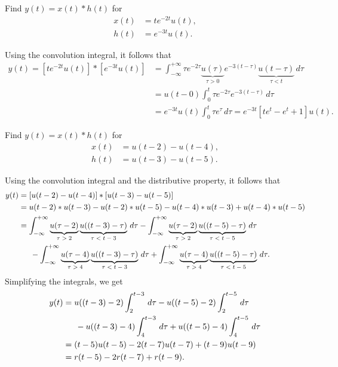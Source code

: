 \documentclass{report}
\begin{document}
\begin{example}
    Find $y(t)=x(t)*h(t)$ for 
    \begin{align*}
        x(t) &= t e^{-2t}u(t), \\
        h(t) &= e^{-3t}u(t).
    \end{align*}
\end{example}
\begin{solution}
    Using the convolution integral, it follows that 
    \begin{align*}
        y(t) = [t e^{-2t}u(t)] * [e^{-3t}u(t)] &= \int_{-\infty}^{+\infty} \tau e^{-2\tau} \underbrace{u(\tau)}_\textrm{$\tau>0$} e^{-3(t-\tau)}\underbrace{u(t-\tau)}_\textrm{$\tau<t$} \,d\tau \\
        &= u(t-0) \int_{0}^{t} \tau e^{-2\tau} e^{-3(t-\tau)} \,d\tau \\
        &= e^{-3t}u(t) \int_{0}^{t} \tau e^{\tau} \,d\tau = e^{-3t}[te^t-e^t+1]u(t).
    \end{align*}
\end{solution}

\begin{example}
    Find $y(t)=x(t)*h(t)$ for 
    \begin{align*}
        x(t) &= u(t-2)-u(t-4), \\
        h(t) &= u(t-3)-u(t-5).
    \end{align*}
\end{example}
\begin{solution}
    Using the convolution integral and the distributive property, it follows that 
    \begin{align*}
        y(t) &= [u(t-2)-u(t-4)] * [u(t-3)-u(t-5)] \\
        &= u(t-2) * u(t-3) - u(t-2) * u(t-5) - u(t-4) * u(t-3) + u(t-4) * u(t-5) \\
        &= \int_{-\infty}^{+\infty} \underbrace{u(\tau-2)}_\textrm{$\tau>2$} \underbrace{u((t-3)-\tau)}_\textrm{$\tau<t-3$} \,d\tau 
        -\int_{-\infty}^{+\infty} \underbrace{u(\tau-2)}_\textrm{$\tau>2$} \underbrace{u((t-5)-\tau)}_\textrm{$\tau<t-5$} \,d\tau \\
        & \indent -\int_{-\infty}^{+\infty} \underbrace{u(\tau-4)}_\textrm{$\tau>4$} \underbrace{u((t-3)-\tau)}_\textrm{$\tau<t-3$} \,d\tau 
        +\int_{-\infty}^{+\infty} \underbrace{u(\tau-4)}_\textrm{$\tau>4$} \underbrace{u((t-5)-\tau)}_\textrm{$\tau<t-5$} \,d\tau.
    \end{align*}
    Simplifying the integrals, we get
    \begin{align*}
        y(t) &= u((t-3)-2)\int_{2}^{t-3} \,d\tau -u((t-5)-2)\int_{2}^{t-5} \,d\tau \\
        & \indent -u((t-3)-4)\int_{4}^{t-3} \,d\tau +u((t-5)-4)\int_{4}^{t-5} \,d\tau \\
        &= (t-5)u(t-5) -2(t-7)u(t-7) +(t-9)u(t-9) \\
        &= r(t-5) - 2r(t-7) + r(t-9).
    \end{align*}
\end{solution}
\end{document}
